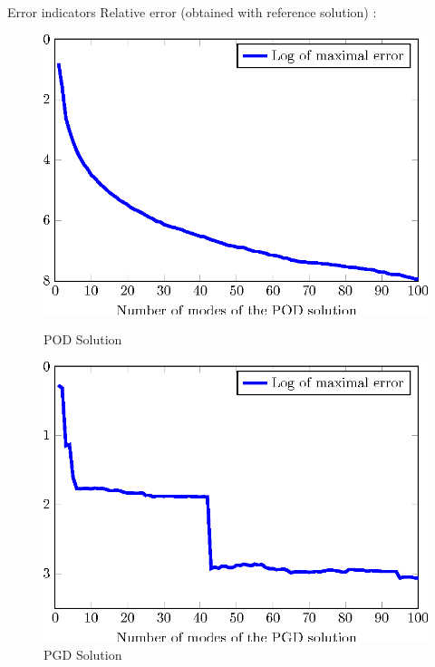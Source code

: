 \documentclass[12pt]{beamer}
\begin{document}
\begin{frame}{Error indicators}
	 Relative error (obtained with reference solution) :
	\begin{figure}
		\begin{minipage}{0.45\linewidth}
			\includegraphics[width=1\linewidth]{Calcul100MPOD.eps}
			\caption{\centering POD Solution}		%
		\end{minipage}
		 \hspace{0.5cm}
		\begin{minipage}{0.45\linewidth}
			\includegraphics[width=1\linewidth]{Calcul100MPGD.eps}
			\caption{\centering PGD Solution}		
		\end{minipage}
	\end{figure}
	
\end{frame}
\end{document}
